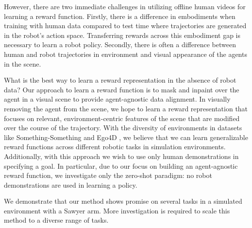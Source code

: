 However, there are two immediate challenges in utilizing offline human videos for learning a reward function. Firstly, there is a difference in embodiments when training with human data compared to test time where trajectories are generated in the robot's action space. Transferring rewards across this embodiment gap is necessary to learn a robot policy. Secondly, there is often a difference between human and robot trajectories in environment and visual appearance of the agents in the scene. 

What is the best way to learn a reward representation in the absence of robot data? Our approach to learn a reward function is to mask and inpaint over the agent in a visual scene to provide agent-agnostic data alignment. In visually removing the agent from the scene, we hope to learn a reward representation that focuses on relevant, environment-centric features of the scene that are modified over the course of the trajectory. With the diversity of environments in datasets like Something-Something \cite{smthsmth} and Ego4D \cite{ego4d}, we believe that we can learn generalizable reward functions across different robotic tasks in simulation environments. Additionally, with this approach we wish to use only human demonstrations in specifying a goal. In particular, due to our focus on building an agent-agnostic reward function, we investigate only the zero-shot paradigm: no robot demonstrations are used in learning a policy.

We demonstrate that our method shows promise on several tasks in a simulated environment with a Sawyer arm. More investigation is required to scale this method to a diverse range of tasks.